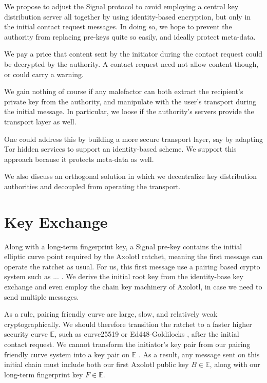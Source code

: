 \documentclass[twoside,letterpaper]{sig-alternate}
\begin{document}
We propose to adjust the Signal protocol to avoid employing a central
key distribution server all together by using identity-based encryption,
but only in the initial contact request messages.
In doing so, we hope to prevent the authority from replacing pre-keys
quite so easily, and ideally protect meta-data.

We pay a price that content sent by the initiator during
 the contact request could be decrypted by the authority.
A contact request need not allow content though, or
 could carry a warning.

We gain nothing of course if any malefactor can both
 extract the recipient's private key from the authority, and
 manipulate with the user's transport during the initial message.
In particular, we loose if the authority's servers provide
 the transport layer as well. 

One could address this by building a more secure transport layer,
say by adapting Tor hidden services to support an identity-based scheme.
We support this approach because it protects meta-data as well.

We also discuss an orthogonal solution in which we decentralize key
distribution authorities and decoupled from operating the transport.

\section{Key Exchange} 

Along with a long-term fingerprint key,
a Signal pre-key contains the initial elliptic curve point required
by the Axolotl ratchet, meaning
 the first message can operate the ratchet as usual.  
%
For us, this first message use a pairing based crypto system
 such as ... \cite{}.
We derive the initial root key from the identity-base key
exchange and even employ the chain key machinery of Axolotl,
 in case we need to send multiple messages. 

As a rule, pairing friendly curve are large, slow, and relatively
 weak cryptographically.
We should therefore transition the ratchet to a faster higher security
curve $\mathbb{E}$, such as curve25519 \cite{} or
 Ed448-Goldilocks \cite{}, after the initial contact request.
We cannot transform the initiator's key pair from
 our pairing friendly curve system 
into a key pair on $\mathbb{E}$ \cite{??no_homomorphism??}.
As a result, any message sent on this initial chain must include both
 our first Axolotl public key $B \in \mathbb{E}$, along with
 our long-term fingerprint key $F \in \mathbb{E}$.
\end{document}
